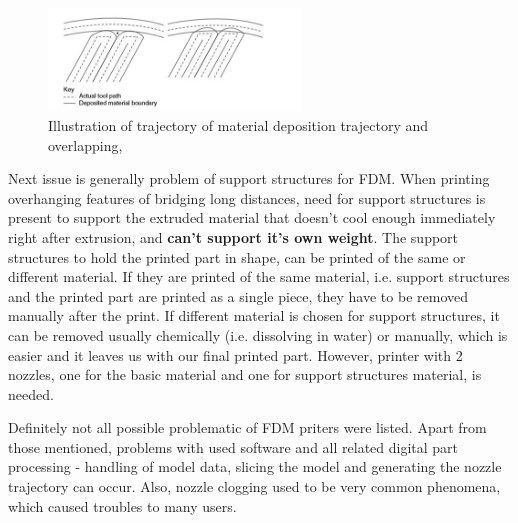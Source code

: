 \documentclass[a4paper, twoside, 11pt]{report}
\begin{document}
\begin{figure}
 	\includegraphics[width=0.6\textwidth]{depositionIllustration}
	\caption{Illustration of trajectory of material deposition trajectory and overlapping, \cite[p. 159]{AMT}}
\end{figure}
	Next issue is generally problem of support structures for FDM. When printing overhanging features of bridging long distances, need for support structures is present to support the extruded material that doesn't cool enough immediately right after extrusion, and \textbf{can't support it's own weight}. The support structures to hold the printed part in shape, can be printed of the same or different material. If they are printed of the same material, i.e. support structures and the printed part are printed as a single piece, they have to be removed manually after the print. If different material is chosen for support structures, it can be removed usually chemically (i.e. dissolving in water) or manually, which is easier and it leaves us with our final printed part. However, printer with 2 nozzles, one for the basic material and one for support structures material, is needed.
	
	Definitely not all possible problematic of FDM priters were listed. Apart from those mentioned, problems with used software and all related digital part processing - handling of model data, slicing the model and generating the nozzle trajectory can occur. Also, nozzle clogging used to be very common phenomena, which caused troubles to many users.
\end{document}
